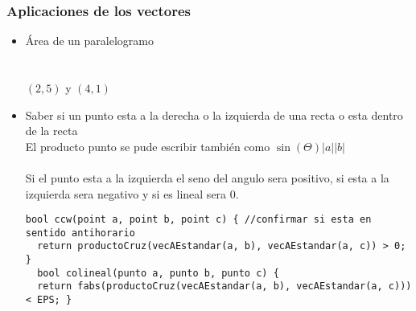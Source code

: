 \subsubsection{Aplicaciones de los vectores}
\begin{itemize}
  \item Área de un paralelogramo
  \\
  \\
  \\
  $\left ( 2,5 \right )$ y $\left (4,1 \right )$
  \item Saber si un punto esta a la derecha o la izquierda  de una recta o esta dentro de la recta
  \\El producto punto se pude escribir también como $\sin \left ( \Theta  \right )\left | a \right |\left | b \right |$
  \\
  \\
  Si el punto esta a la izquierda el seno del angulo sera positivo, si esta a la izquierda sera negativo y si es lineal sera 0.
  \begin{lstlisting}[style=C]
  bool ccw(point a, point b, point c) { //confirmar si esta en sentido antihorario
  return productoCruz(vecAEstandar(a, b), vecAEstandar(a, c)) > 0; }
  bool colineal(punto a, punto b, punto c) {
  return fabs(productoCruz(vecAEstandar(a, b), vecAEstandar(a, c))) < EPS; }
  \end{lstlisting}
\end{itemize}
